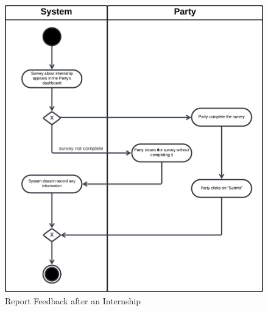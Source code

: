 \begin{figure}[H]
    \begin{center}
         \includegraphics[width=1\linewidth]{LaTeXCode/images/activity diagram/UC18.png}
         \caption{Report Feedback after an Internship}
         \label{fig:report_problems_ad}
     \end{center}
\end{figure}

\newpage

